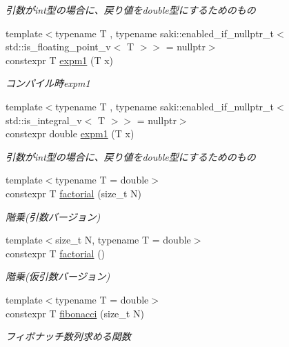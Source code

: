 \begin{DoxyCompactItemize}
\begin{DoxyCompactList}\small\item\em 引数がint型の場合に、戻り値をdouble型にするためのもの \end{DoxyCompactList}\item 
{\footnotesize template$<$typename T , typename saki\+::enabled\+\_\+if\+\_\+nullptr\+\_\+t$<$ std\+::is\+\_\+floating\+\_\+point\+\_\+v$<$ T $>$$>$  = nullptr$>$ }\\constexpr T \mbox{\hyperlink{namespacesaki_aabb63a6251c75f6f1e76a58f5438de69}{expm1}} (T x)
\begin{DoxyCompactList}\small\item\em コンパイル時expm1 \end{DoxyCompactList}\item 
{\footnotesize template$<$typename T , typename saki\+::enabled\+\_\+if\+\_\+nullptr\+\_\+t$<$ std\+::is\+\_\+integral\+\_\+v$<$ T $>$$>$  = nullptr$>$ }\\constexpr double \mbox{\hyperlink{namespacesaki_ae4490f448ed3d82712306c54d6821788}{expm1}} (T x)
\begin{DoxyCompactList}\small\item\em 引数がint型の場合に、戻り値をdouble型にするためのもの \end{DoxyCompactList}\item 
{\footnotesize template$<$typename T  = double$>$ }\\constexpr T \mbox{\hyperlink{namespacesaki_a224c4843b72acf995e13809a5caaafd8}{factorial}} (size\+\_\+t N)
\begin{DoxyCompactList}\small\item\em 階乗(引数バージョン) \end{DoxyCompactList}\item 
{\footnotesize template$<$size\+\_\+t N, typename T  = double$>$ }\\constexpr T \mbox{\hyperlink{namespacesaki_a9dead910b791cee99cf82d1bd2a5d90c}{factorial}} ()
\begin{DoxyCompactList}\small\item\em 階乗(仮引数バージョン) \end{DoxyCompactList}\item 
{\footnotesize template$<$typename T  = double$>$ }\\constexpr T \mbox{\hyperlink{namespacesaki_a93bb6ae29766c4204c1cf8dc5bab007c}{fibonacci}} (size\+\_\+t N)
\begin{DoxyCompactList}\small\item\em フィボナッチ数列求める関数 \end{DoxyCompactList}\item 

\end{DoxyCompactItemize}

